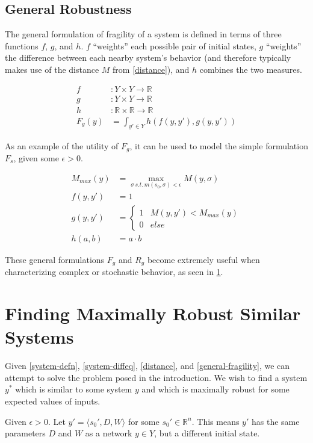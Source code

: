 \documentclass{article}
\begin{document}
\subsection{General Robustness} \label{general-robustness}
The general formulation of fragility of a system is defined in terms of three functions $f$, $g$, and $h$. $f$ ``weights'' each possible pair of initial states, $g$ ``weights'' the difference between each nearby system's behavior (and therefore typically makes use of the distance $M$ from \eqref{distance}), and $h$ combines the two measures.

\begin{align}
  f &: Y \times Y \to \mathbb{R} \\
  g &: Y \times Y \to \mathbb{R} \\
  h &: \mathbb{R} \times \mathbb{R} \to \mathbb{R} \\
  F_g(y) &= \int_{y' \in Y} h(f(y, y'), g(y, y')) \label{general-fragility}
\end{align}

As an example of the utility of $F_g$, it can be used to model the simple formulation $F_s$, given some $\epsilon > 0$.

\begin{align}
  M_{max}(y) &= \max\limits_{\sigma \,s.t.\, m(s_0, \sigma) < \epsilon} M(y, \sigma) \\
  f(y, y') &= 1 \\
  g(y, y') &= \begin{cases}
    1 & M(y, y') < M_{max}(y) \\
    0 & else
  \end{cases} \\
  h(a, b) &= a \cdot b
\end{align}

These general formulations $F_g$ and $R_g$ become extremely useful when characterizing complex or stochastic behavior, as seen in \ref{max-robust}.

\section{Finding Maximally Robust Similar Systems} \label{max-robust}
Given \eqref{system-defn}, \eqref{system-diffeq}, \eqref{distance}, and \eqref{general-fragility}, we can attempt to solve the problem posed in the introduction. We wish to find a system $y^*$ which is similar to some system $y$ and which is maximally robust for some expected values of inputs.

Given $\epsilon > 0$. Let $y' = \langle s_0', D, W \rangle$ for some $s_0' \in \mathbb{R}^n$. This means $y'$ has the same parameters $D$ and $W$ as a network $y \in Y$, but a different initial state.
\end{document}

